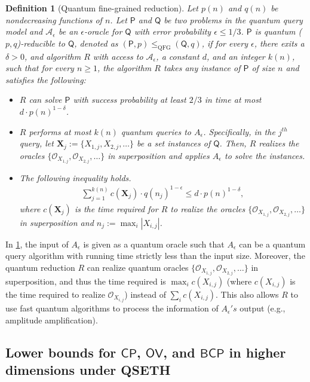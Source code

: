 \documentclass[10pt,a4paper]{article}
\newtheorem{definition}[theorem]{Definition}
\newcommand{\eps}{\epsilon}
\newcommand{\A}{\mathcal{A}}
\renewcommand{\eps}{\epsilon}
\newcommand{\ora}{\mathcal{O}}
\newcommand{\QFG}{\mathrm{QFG}}
\newcommand{\CP}{\ensuremath{\mathsf{CP}}}
\newcommand{\OV}{\ensuremath{\mathsf{OV}}}
\newcommand{\BCP}{\ensuremath{\mathsf{BCP}}}
\begin{document}
\begin{definition}[Quantum fine-grained reduction]\label{def:qfgr}
Let $p(n)$ and $q(n)$ be nondecreasing functions of $n$. Let $\mathsf{P}$ and $\mathsf{Q}$ be two problems in the quantum query model and $\A_{\epsilon}$ be an $\epsilon$-oracle for $\mathsf{Q}$ with error probability $\epsilon\leq 1/3$. $\mathsf{P}$ is quantum ($p,q$)-reducible to $\mathsf{Q}$, denoted as $(\mathsf{P},p)\leq_{\QFG} (\mathsf{Q},q)$, if for every $\epsilon$, there exits a $\delta>0$, and algorithm $R$ with access to $\A_{\epsilon}$, a constant $d$, and an integer $k(n)$, such that for every $n\ge 1$, the algorithm $R$ takes any instance of $\mathsf{P}$ of size $n$ and satisfies the following: 
\begin{itemize}
    \item $R$ can solve $\mathsf{P}$ with success probability at least $2/3$ in time at most $d\cdot p(n)^{1-\delta}$.
    \item $R$ performs at most $k(n)$ quantum queries to $A_\epsilon$. Specifically, in the $j^{th}$ query, let $\mathbf{X}_j:= \{X_{1,j},X_{2,j},\dots\}$ be a set instances of $\mathsf{Q}$. Then, $R$ realizes the oracles $\{\ora_{X_{1,j}},\ora_{X_{2,j}},\dots\}$ in superposition and applies $A_{\eps}$ to solve the instances.
    \item The following inequality holds.
    \begin{align*}
        \sum_{j=1}^{k(n)}c(\mathbf{X}_j)\cdot q(n_j)^{1-\epsilon} \leq d\cdot p(n)^{1-\delta}, 
    \end{align*}
    where $c(\mathbf{X}_j)$ is the time required for $R$ to realize the oracles $\{\ora_{X_{1,j}},\ora_{X_{2,j}},\dots\}$ in superposition and $n_j := \max_{i}|X_{i,j}|$. 
\end{itemize}
\end{definition}

In \cref{def:qfgr}, the input of $A_{\eps}$ is given as a quantum oracle such that $A_{\eps}$ can be a quantum query algorithm with running time strictly less than the input size. Moreover, the quantum reduction $R$ can realize quantum oracles $\{\ora_{X_{1,j}},\ora_{X_{2,j}},\dots\}$ in superposition, and thus the time required is $\max_i c(X_{i,j})$ (where $c(X_{i,j})$ is the time required to realize $\ora_{X_{i,j}}$) instead of $\sum_{i} c(X_{i,j})$. This also allows $R$ to use fast quantum algorithms to process the information of $A_{\epsilon}'s$ output (e.g., amplitude amplification). 

\subsection{Lower bounds for $\CP$, $\OV$, and $\BCP$ in higher dimensions under QSETH}
\end{document}

